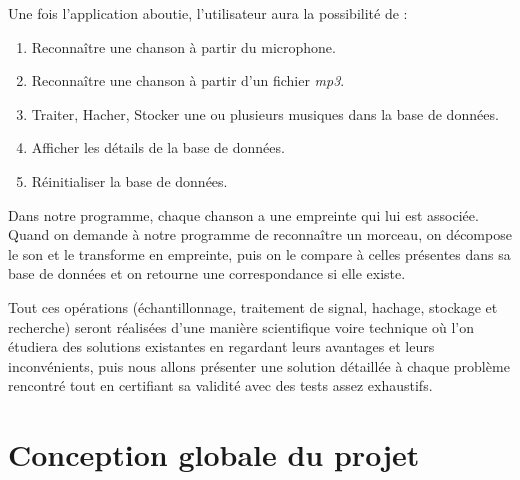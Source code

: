 \documentclass[11pt, report, french]{scrreprt}
\begin{document}
Une fois l'application aboutie, l'utilisateur aura la possibilité de :\\

\begin{enumerate}
	\item Reconnaître une chanson à partir du microphone.
	\item Reconnaître une chanson à partir d'un fichier \textit{mp3}.
    \item Traiter, Hacher, Stocker une ou plusieurs musiques dans la base de données.
	\item Afficher les détails de la base de données.
	\item Réinitialiser la base de données.
\end{enumerate}

\vspace{0.5cm}
Dans notre programme, chaque chanson a une empreinte qui lui est associée. Quand on demande à notre programme de reconnaître un morceau, on décompose le son et le transforme en empreinte, puis on le compare à celles présentes dans sa base de données et on retourne une correspondance si elle existe.\\\par

Tout ces opérations (échantillonnage, traitement de signal, hachage, stockage et recherche) seront réalisées d'une manière scientifique voire technique où l'on étudiera des solutions existantes en regardant leurs avantages et leurs inconvénients, puis nous allons présenter une solution détaillée à chaque problème rencontré tout en certifiant sa validité avec des tests assez exhaustifs.


\section{Conception globale du projet}
\end{document}
